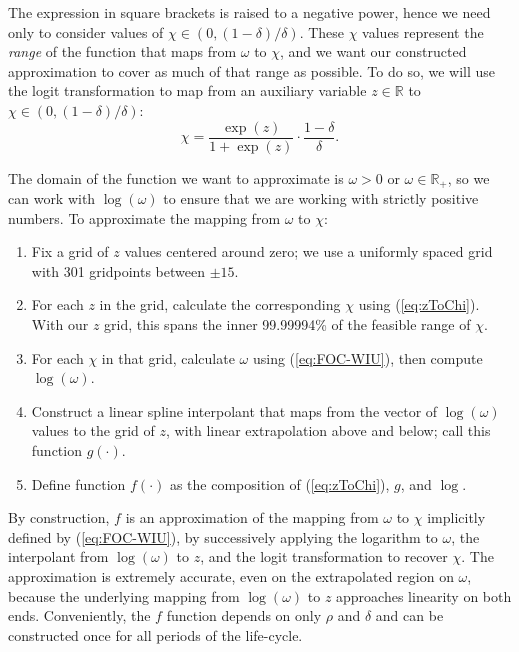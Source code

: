 \documentclass[12pt,letterpaper, fleqn]{article}
\newcommand{\R}{\mathbb{R}}
\newcommand{\CRRA}{\rho}
\begin{document}
The expression in square brackets is raised to a negative power, hence we need only to consider values of $\chi \in (0, (1 -\delta)/\delta)$. These $\chi$ values represent the \textit{range} of the function that maps from $\omega$ to $\chi$, and we want our constructed approximation to cover as much of that range as possible. To do so, we will use the logit transformation to map from an auxiliary variable $z \in \R$ to $\chi \in (0, (1 -\delta)/\delta)$:
\begin{equation}
\label{eq:zToChi}
\chi = \frac{\exp(z)}{1 + \exp(z)} \cdot \frac{1-\delta}{\delta}.
\end{equation}

The domain of the function we want to approximate is $\omega > 0$ or $\omega \in \R_+$, so we can work with $\log(\omega)$ to ensure that we are working with strictly positive numbers. To approximate the mapping from $\omega$ to $\chi$:

\begin{enumerate}
\item Fix a grid of $z$ values centered around zero; we use a uniformly spaced grid with 301 gridpoints between $\pm 15$.

\item For each $z$ in the grid, calculate the corresponding $\chi$ using (\ref{eq:zToChi}). With our $z$ grid, this spans the inner 99.99994\% of the feasible range of $\chi$.

\item For each $\chi$ in that grid, calculate $\omega$ using (\ref{eq:FOC-WIU}), then compute $\log(\omega)$.

\item Construct a linear spline interpolant that maps from the vector of $\log(\omega)$ values to the grid of $z$, with linear extrapolation above and below; call this function $g(\cdot)$.

\item Define function $f(\cdot)$ as the composition of (\ref{eq:zToChi}), $g$, and $\log$.
\end{enumerate}

By construction, $f$ is an approximation of the mapping from $\omega$ to $\chi$ implicitly defined by (\ref{eq:FOC-WIU}), by successively applying the logarithm to $\omega$, the interpolant from $\log(\omega)$ to $z$, and the logit transformation to recover $\chi$. The approximation is extremely accurate, even on the extrapolated region on $\omega$, because the underlying mapping from $\log(\omega)$ to $z$ approaches linearity on both ends. Conveniently, the $f$ function depends on only $\CRRA$ and $\delta$ and can be constructed once for all periods of the life-cycle.
\end{document}
